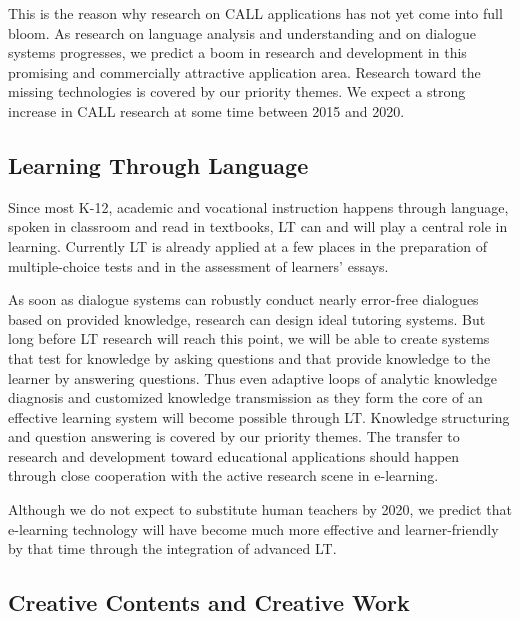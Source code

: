 \documentclass[10pt, plain]{../../metanetpaper}
\begin{document}
\begin{multicols}{2}
This is the reason why research on CALL applications has not yet come into full bloom. As research on language analysis and understanding and on dialogue systems progresses, we predict a boom in research and development in this promising and commercially attractive application area. Research toward the missing technologies is covered by our priority themes. We expect a strong increase in CALL research at some time between 2015 and 2020.

\subsection{Learning Through Language}
\label{sec:learn-thro-lang}

Since most K-12, academic and vocational instruction happens through language, spoken in classroom and read in textbooks, LT can and will play a central role in learning. Currently LT is already applied at a few places in the preparation of multiple-choice tests and in the assessment of learners’ essays.
 
As soon as dialogue systems can robustly conduct nearly error-free dialogues based on provided knowledge, research can design ideal tutoring systems. But long before LT research will reach this point, we will be able to create systems that test for knowledge by asking questions and that provide knowledge to the learner by answering questions. Thus even adaptive loops of analytic knowledge diagnosis and customized knowledge transmission as they form the core of an effective learning system will become possible through LT. Knowledge structuring and question answering is covered by our priority themes. The transfer to research and development toward educational applications should happen through close cooperation with the active research scene in e-learning.
 
Although we do not expect to substitute human teachers by 2020, we predict that e-learning technology will have become much more effective and learner-friendly by that time through the integration of advanced LT.

\subsection{Creative Contents and Creative Work}
\label{sec:lt-creative-contents}



\end{multicols}
\end{document}
